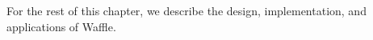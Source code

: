 For the rest of this chapter, we describe the design, implementation, and applications of Waffle.





